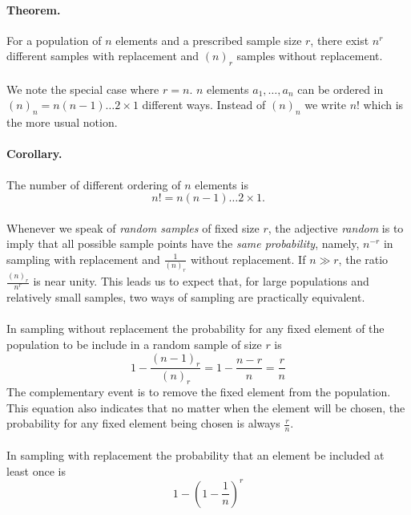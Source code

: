 \documentclass{article}
\numberwithin{equation}{subsection}
\begin{document}
			\paragraph{Theorem. } For a population of $n$ elements and a prescribed sample size $r$, there exist $n^r$ different samples with replacement and $(n)_r$ samples without replacement.			
			\paragraph{} We note the special case where $r=n$. $n$ elements $a_1,\dots,a_n$ can be ordered in $(n)_n = n(n-1)\dots2\times1$ different ways. Instead of $(n)_n$ we write $n!$ which is the more usual notion.
			\paragraph{Corollary. } The number of different ordering of $n$ elements is
			\begin{equation}
				n! = n(n-1)\dots 2\times 1.
			\end{equation}
			\paragraph{} Whenever we speak of \textit{random samples} of fixed size $r$, the adjective \textit{random} is to imply that all possible sample points have the \textit{same probability}, namely, $n^{-r}$ in sampling with replacement and $\frac{1}{(n)_r}$ without replacement. If $n \gg r$, the ratio $\frac{(n)_r}{n^r}$ is near unity. This leads us to expect that, for large populations and relatively small samples, two ways of sampling are practically equivalent.
			\paragraph{} In sampling without replacement the probability for any fixed element of the population to be include in a random sample of size $r$ is
			\begin{equation}
				1-\frac{(n-1)_r}{(n)_r} = 1-\frac{n-r}{n} = \frac{r}{n}
			\end{equation}
			The complementary event is to remove the fixed element from the population. This equation also indicates that no matter when the element will be chosen, the probability for any fixed element being chosen is always $\frac{r}{n}$.
			\paragraph{} In sampling with replacement the probability that an element be included at least once is
			\begin{equation}
				1 - {\left( 1 - \frac{1}{n} \right)}^r
			\end{equation}
\end{document}
